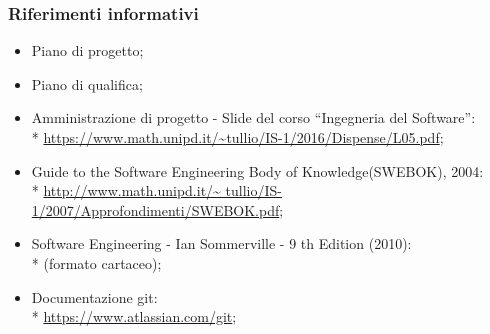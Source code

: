 \subsubsection{Riferimenti informativi}
\begin{itemize}
\item Piano di progetto;
\item Piano di qualifica;
\item Amministrazione di progetto - Slide del corso “Ingegneria del
Software”: \\*
	\url{https://www.math.unipd.it/~tullio/IS-1/2016/Dispense/L05.pdf};
\item Guide to the Software Engineering Body of Knowledge(SWEBOK), 2004: \\*
	\url{http://www.math.unipd.it/~	tullio/IS-1/2007/Approfondimenti/SWEBOK.pdf};
\item Software Engineering - Ian Sommerville - 9 th Edition (2010): \\*
(formato cartaceo);
\item Documentazione git: \\*
	\url{https://www.atlassian.com/git};
\end{itemize}
